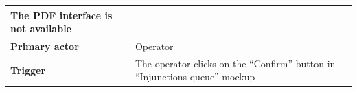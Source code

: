 {{{\begin{table}[h]
\begin{tabular}{|p{4cm}|p{10cm}|}
				The PDF interface is not available \vspace{1mm}\\
			\hline
				\centering \vspace{1mm} \bfseries{Primary actor} \vspace{1mm} & 
				\vspace{1mm} Operator \vspace{1mm}\\
			\hline
				\centering \vspace{1mm} \bfseries{Trigger} \vspace{1mm} & 
				\vspace{1mm} The operator clicks on the “Confirm” button in “Injunctions queue” mockup \vspace{1mm}\\
			\hline
			\end{tabular}
			\end{table}

}}}
